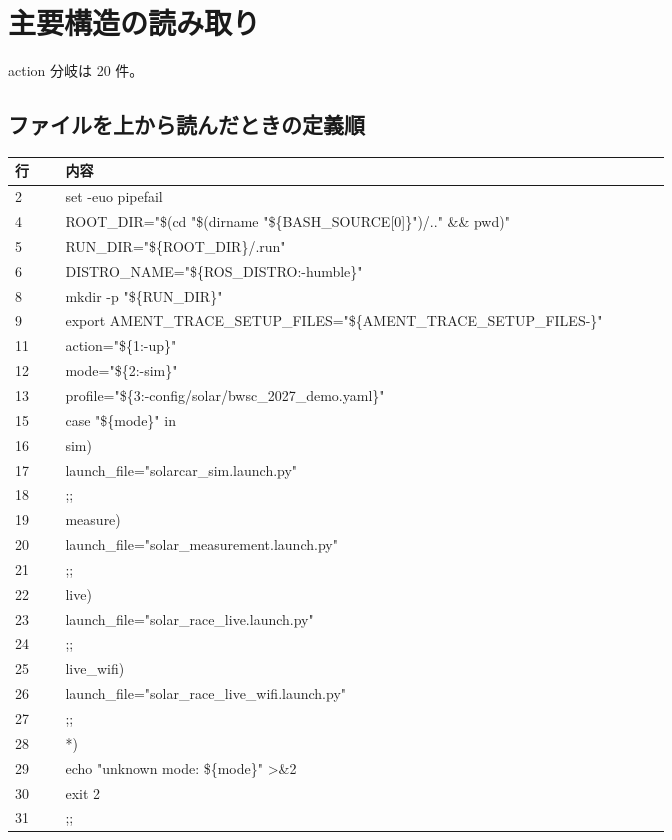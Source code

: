 \documentclass[a4paper,11pt]{article}
\begin{document}
        \section{主要構造の読み取り}
        action 分岐は 20 件。



        \subsection{ファイルを上から読んだときの定義順}
            \begin{longtable}{p{0.07\linewidth} p{0.84\linewidth}}
            \toprule
            行 & 内容 \\
            \midrule
            2 & set -euo pipefail \\
4 & ROOT\_DIR="\$(cd "\$(dirname "\$\{BASH\_SOURCE[0]\}")/.." \&\& pwd)" \\
5 & RUN\_DIR="\$\{ROOT\_DIR\}/.run" \\
6 & DISTRO\_NAME="\$\{ROS\_DISTRO:-humble\}" \\
8 & mkdir -p "\$\{RUN\_DIR\}" \\
9 & export AMENT\_TRACE\_SETUP\_FILES="\$\{AMENT\_TRACE\_SETUP\_FILES-\}" \\
11 & action="\$\{1:-up\}" \\
12 & mode="\$\{2:-sim\}" \\
13 & profile="\$\{3:-config/solar/bwsc\_2027\_demo.yaml\}" \\
15 & case "\$\{mode\}" in \\
16 & sim) \\
17 & launch\_file="solarcar\_sim.launch.py" \\
18 & ;; \\
19 & measure) \\
20 & launch\_file="solar\_measurement.launch.py" \\
21 & ;; \\
22 & live) \\
23 & launch\_file="solar\_race\_live.launch.py" \\
24 & ;; \\
25 & live\_wifi) \\
26 & launch\_file="solar\_race\_live\_wifi.launch.py" \\
27 & ;; \\
28 & *) \\
29 & echo "unknown mode: \$\{mode\}" >\&2 \\
30 & exit 2 \\
31 & ;; \\

\end{longtable}
\end{document}
